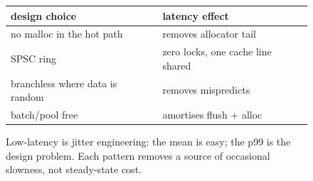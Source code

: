 \begin{figure}[htbp]
\centering
\begin{tabular}{ll}
\toprule
design choice & latency effect \\
\midrule
no malloc in the hot path & removes allocator tail \\
SPSC ring & zero locks, one cache line shared \\
branchless where data is random & removes mispredicts \\
batch/pool free & amortises flush + alloc \\
\bottomrule
\end{tabular}
\caption{Low-latency is jitter engineering: the mean is easy; the
p99 is the design problem. Each pattern removes a source of
occasional slowness, not steady-state cost.}
\label{fig:jitter17}
\end{figure}
